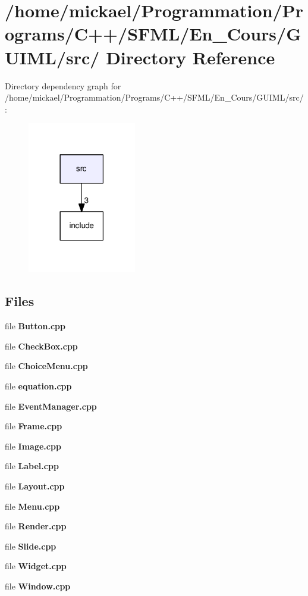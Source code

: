 \section{/home/mickael/\-Programmation/\-Programs/\-C++/\-S\-F\-M\-L/\-En\-\_\-\-Cours/\-G\-U\-I\-M\-L/src/ Directory Reference}
\label{dir_4793349e4ac4dac0fd464b66e541df9e}
Directory dependency graph for /home/mickael/\-Programmation/\-Programs/\-C++/\-S\-F\-M\-L/\-En\-\_\-\-Cours/\-G\-U\-I\-M\-L/src/\-:\nopagebreak
\begin{figure}[H]
\begin{center}
\leavevmode
\includegraphics[width=134pt]{dir_4793349e4ac4dac0fd464b66e541df9e_dep}
\end{center}
\end{figure}
\subsection*{Files}
\begin{DoxyCompactItemize}
\item 
file {\bfseries Button.\-cpp}
\item 
file {\bfseries Check\-Box.\-cpp}
\item 
file {\bfseries Choice\-Menu.\-cpp}
\item 
file {\bfseries equation.\-cpp}
\item 
file {\bfseries Event\-Manager.\-cpp}
\item 
file {\bfseries Frame.\-cpp}
\item 
file {\bfseries Image.\-cpp}
\item 
file {\bfseries Label.\-cpp}
\item 
file {\bfseries Layout.\-cpp}
\item 
file {\bfseries Menu.\-cpp}
\item 
file {\bfseries Render.\-cpp}
\item 
file {\bfseries Slide.\-cpp}
\item 
file {\bfseries Widget.\-cpp}
\item 
file {\bfseries Window.\-cpp}
\end{DoxyCompactItemize}
